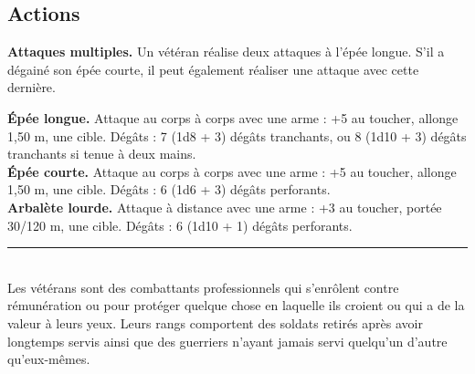 \begin{figure*}[hb!]
{\begin{minipage}[c]{.45\linewidth}
    \subsection*{Actions}
    {\bfseries Attaques multiples.} Un vétéran réalise deux attaques à l'épée longue. S'il a dégainé son épée courte, il peut également réaliser une attaque avec cette dernière.
  \end{minipage}
  \hspace{4pt}
  \begin{minipage}[c]{.45\linewidth}
    {\bfseries Épée longue.} Attaque au corps à corps avec une arme : +5 au toucher, allonge 1,50 m, une cible. Dégâts : 7 (1d8 + 3) dégâts tranchants, ou 8 (1d10 + 3) dégâts tranchants si tenue à deux mains. \\
    {\bfseries Épée courte.} Attaque au corps à corps avec une arme : +5 au toucher, allonge 1,50 m, une cible. Dégâts : 6 (1d6 + 3) dégâts perforants. \\
    {\bfseries Arbalète lourde.} Attaque à distance avec une arme : +3 au toucher, portée 30/120 m, une cible. Dégâts : 6 (1d10 + 1) dégâts perforants. \\
    \noindent\rule{\textwidth}{1pt} \\
Les vétérans sont des combattants professionnels qui s'enrôlent contre rémunération ou pour protéger quelque chose en laquelle ils croient ou qui a de la valeur à leurs yeux. Leurs rangs comportent des soldats retirés après avoir longtemps servis ainsi que des guerriers n'ayant jamais servi quelqu'un d'autre qu'eux-mêmes.
  \end{minipage}
}%
\end{figure*}

